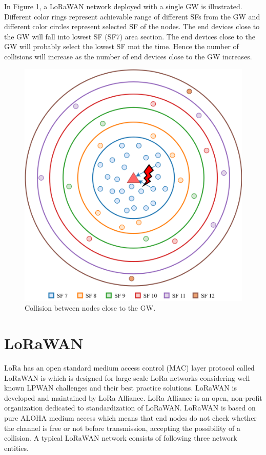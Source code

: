 \documentclass[conference]{IEEEtran}
\begin{document}
\par In Figure \ref{fig:collision}, a LoRaWAN network deployed with a single GW is illustrated. Different color rings represent achievable range of different SFs from the GW and different color circles represent selected SF of the nodes. The end devices close to the GW will fall into lowest SF (SF7) area section. The end devices close to the GW will probably select the lowest SF mot the time. Hence the number of collisions will increase as the number of end devices close to the GW increases.

\begin{figure}
\centering
\includegraphics[width=\linewidth]{collision}
\caption{Collision between nodes close to the GW.}
\label{fig:collision}
\end{figure}


\section{LoRaWAN} \label{LoRaWAN}
\par LoRa has an open standard medium access control (MAC) layer protocol called LoRaWAN is which is designed for large scale LoRa networks considering well known LPWAN challenges and their best practice solutions. LoRaWAN is developed and maintained by LoRa Alliance. LoRa Alliance is an open, non-profit organization dedicated to standardization of LoRaWAN. LoRaWAN is based on pure ALOHA medium access which means that end nodes do not check whether the channel is free or not before transmission, accepting the possibility of a collision. A typical LoRaWAN network consists of following three network entities.
\end{document}
